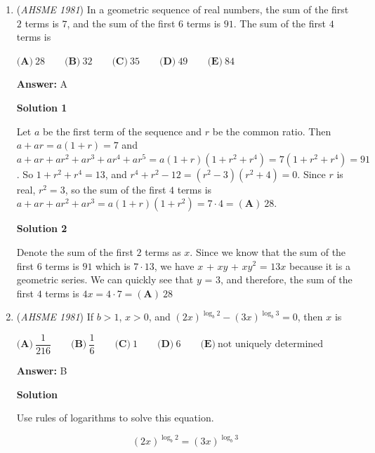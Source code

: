 \begin{enumerate}
 Substituting $\log_{10}{3} \approx 0.477$ yields $n > \frac{-1}{-1 + 2 \cdot 0.477} = \frac{-1}{-0.046} \approx 21.7$, so the minimum possible integer value of $n$ is $\boxed{(\textbf{E})\ 22}$.

 -edited by Maxxie, maxamc, j314andrews

 


	\item (\textit{AHSME 1981}) In a geometric sequence of real numbers, the sum of the first $2$ terms is $7$, and the sum of the first $6$ terms is $91$. The sum of the first $4$ terms is


 $\textbf{(A)}\ 28\qquad\textbf{(B)}\ 32\qquad\textbf{(C)}\ 35\qquad\textbf{(D)}\ 49\qquad\textbf{(E)}\ 84$

 \textbf{Answer: }A



\textbf{Solution 1}

Let $a$ be the first term of the sequence and $r$ be the common ratio.  Then $a+ar = a(1+r) = 7$ and $a+ar+ar^2+ar^3+ar^4+ar^5 = a(1+r)(1+r^2+r^4) = 7(1+r^2+r^4) = 91$.  So $1+r^2+r^4=13$, and $r^4+r^2-12=(r^2-3)(r^2+4)=0$.  Since $r$ is real, $r^2 = 3$, so the sum of the first $4$ terms is $a+ar+ar^2+ar^3 = a(1+r)(1+r^2) = 7\cdot 4 = \boxed{(\textbf{A})\ 28}$.

 



\textbf{Solution 2}

Denote the sum of the first $2$ terms as $x$. Since we know that the sum of the first $6$ terms is $91$ which is $7 \cdot 13$, we have $x$ + $xy$ + $xy^2$ = $13x$ because it is a geometric series. We can quickly see that $y$ = $3$, and therefore, the sum of the first $4$ terms is $4x = 4 \cdot 7 = \boxed {(\textbf{A})\ 28}$



	\item (\textit{AHSME 1981}) If $b>1$, $x>0$, and $(2x)^{\log_b 2}-(3x)^{\log_b 3}=0$, then $x$ is


 $\textbf{(A)}\ \dfrac{1}{216}\qquad\textbf{(B)}\ \dfrac{1}{6}\qquad\textbf{(C)}\ 1\qquad\textbf{(D)}\ 6\qquad\textbf{(E)}\ \text{not uniquely determined}$

 \textbf{Answer: }B



\textbf{Solution}

Use rules of logarithms to solve this equation.  

 
 \[(2x)^{\log_{b} 2} = (3x)^{\log_{b} 3}\]


\end{enumerate}
